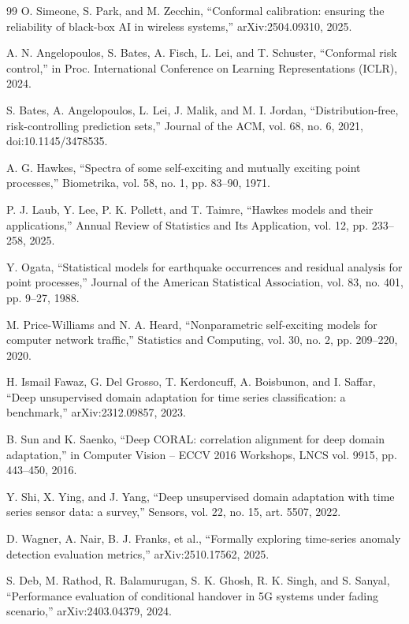 \begin{thebibliography}{99}
 O. Simeone, S. Park, and M. Zecchin, ``Conformal calibration: ensuring the reliability of black-box AI in wireless systems,'' arXiv:2504.09310, 2025.

 A. N. Angelopoulos, S. Bates, A. Fisch, L. Lei, and T. Schuster, ``Conformal risk control,'' in Proc. International Conference on Learning Representations (ICLR), 2024.

 S. Bates, A. Angelopoulos, L. Lei, J. Malik, and M. I. Jordan, ``Distribution-free, risk-controlling prediction sets,'' Journal of the ACM, vol. 68, no. 6, 2021, doi:10.1145/3478535.

 A. G. Hawkes, ``Spectra of some self-exciting and mutually exciting point processes,'' Biometrika, vol. 58, no. 1, pp. 83--90, 1971.

 P. J. Laub, Y. Lee, P. K. Pollett, and T. Taimre, ``Hawkes models and their applications,'' Annual Review of Statistics and Its Application, vol. 12, pp. 233--258, 2025.

 Y. Ogata, ``Statistical models for earthquake occurrences and residual analysis for point processes,'' Journal of the American Statistical Association, vol. 83, no. 401, pp. 9--27, 1988.

 M. Price-Williams and N. A. Heard, ``Nonparametric self-exciting models for computer network traffic,'' Statistics and Computing, vol. 30, no. 2, pp. 209--220, 2020.

 H. Ismail Fawaz, G. Del Grosso, T. Kerdoncuff, A. Boisbunon, and I. Saffar, ``Deep unsupervised domain adaptation for time series classification: a benchmark,'' arXiv:2312.09857, 2023.

 B. Sun and K. Saenko, ``Deep CORAL: correlation alignment for deep domain adaptation,'' in Computer Vision -- ECCV 2016 Workshops, LNCS vol. 9915, pp. 443--450, 2016.

 Y. Shi, X. Ying, and J. Yang, ``Deep unsupervised domain adaptation with time series sensor data: a survey,'' Sensors, vol. 22, no. 15, art. 5507, 2022.

 D. Wagner, A. Nair, B. J. Franks, et al., ``Formally exploring time-series anomaly detection evaluation metrics,'' arXiv:2510.17562, 2025.

 S. Deb, M. Rathod, R. Balamurugan, S. K. Ghosh, R. K. Singh, and S. Sanyal, ``Performance evaluation of conditional handover in 5G systems under fading scenario,'' arXiv:2403.04379, 2024.


\end{thebibliography}
